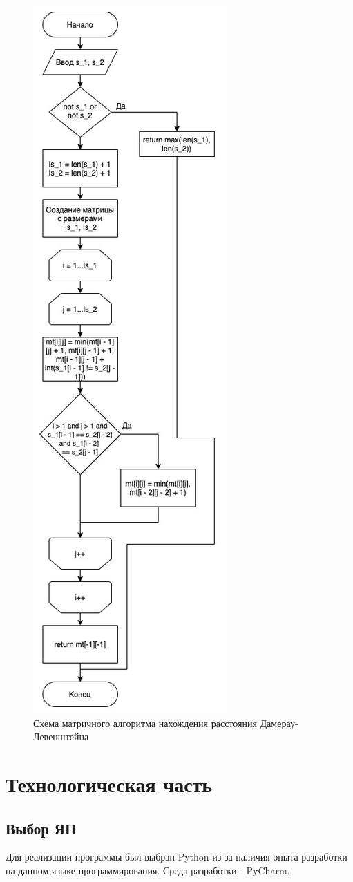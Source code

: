 \documentclass[12pt, a4paper]{report}
\begin{document}
\begin{figure}[h]
\centering
\includegraphics[width=0.4\linewidth]{ldm.jpg}
\caption{Схема матричного алгоритма нахождения расстояния Дамерау-Левенштейна}
\label{fig:mpr}
\end{figure}


\chapter{Технологическая часть}
\section{Выбор ЯП}
Для реализации программы был выбран Python из-за наличия опыта разработки на данном языке программирования. Среда разработки - PyCharm.
\end{document}

